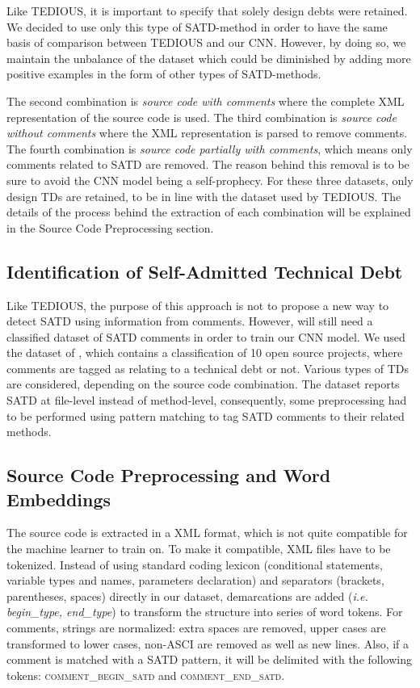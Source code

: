 Like TEDIOUS, it is important to specify that solely design debts were retained. We decided to use only this type of SATD-method in order to have the same basis of comparison between TEDIOUS and our CNN. However, by doing so, we maintain the unbalance of the dataset which could be diminished by adding more positive examples in the form of other types of SATD-methods.

The second combination is \textit{source code with comments} where the complete XML representation of the source code is used. The third combination is \textit{source code without comments} where the XML representation is parsed to remove comments. The fourth combination is \textit{source code partially with comments}, which means only comments related to SATD are removed. The reason behind this removal is to be sure to avoid the CNN model being a self-prophecy. For these three datasets, only design TDs are retained, to be in line with the dataset used by TEDIOUS. The details of the process behind the extraction of each combination will be explained in the Source Code Preprocessing section.

\subsection{Identification of Self-Admitted Technical Debt}


Like TEDIOUS, the purpose of this approach is not to propose a new way to detect SATD using information from comments. However, will still need a classified dataset of SATD comments in order to train our CNN model. We used the dataset of \citet{maldonado17}, which contains a classification of 10 open source projects, where comments are tagged as relating to a technical debt or not. Various types of TDs are considered, depending on the source code combination. The dataset reports SATD at file-level instead of method-level, consequently, some preprocessing had to be performed using pattern matching to tag SATD comments to their related methods.

\subsection{Source Code Preprocessing and Word Embeddings}


The source code is extracted in a XML format, which is not quite compatible for the machine learner to train on. To make it compatible, XML files have to be tokenized. Instead of using standard coding lexicon (conditional statements, variable types and names, parameters declaration) and separators (brackets, parentheses, spaces) directly in our dataset, demarcations are added (\textit{i.e. begin\_type, end\_type}) to transform the structure into series of word tokens. For comments, strings are normalized: extra spaces are removed, upper cases are transformed to lower cases, non-ASCI are removed as well as new lines. Also, if a comment is matched with a SATD pattern, it will be delimited with the following tokens: \textsc{comment\_begin\_satd} and \textsc{comment\_end\_satd}. 

